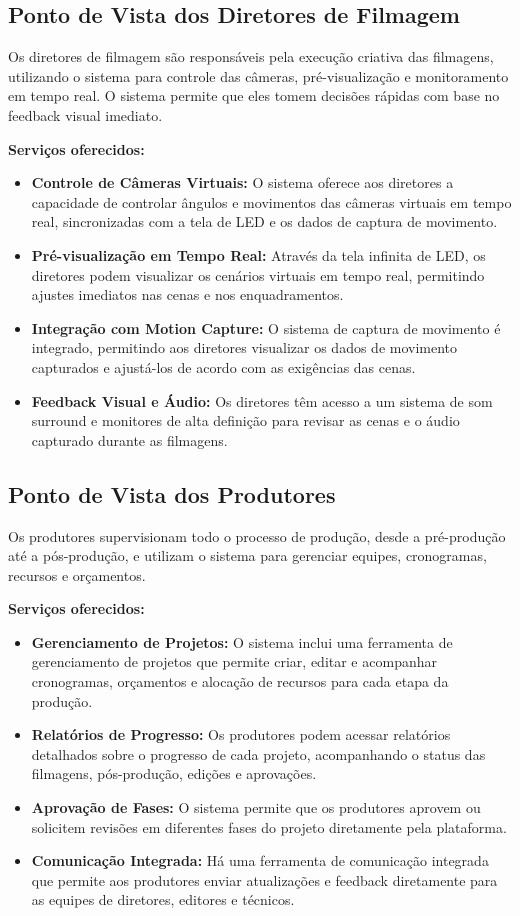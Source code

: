 \subsection{Ponto de Vista dos Diretores de Filmagem}

Os diretores de filmagem são responsáveis pela execução criativa das filmagens, utilizando o sistema para controle das câmeras, pré-visualização e monitoramento em tempo real. O sistema permite que eles tomem decisões rápidas com base no feedback visual imediato.

\textbf{Serviços oferecidos:}
\begin{itemize}
  \item \textbf{Controle de Câmeras Virtuais:} O sistema oferece aos diretores a capacidade de controlar ângulos e movimentos das câmeras virtuais em tempo real, sincronizadas com a tela de LED e os dados de captura de movimento.
  \item \textbf{Pré-visualização em Tempo Real:} Através da tela infinita de LED, os diretores podem visualizar os cenários virtuais em tempo real, permitindo ajustes imediatos nas cenas e nos enquadramentos.
  \item \textbf{Integração com Motion Capture:} O sistema de captura de movimento é integrado, permitindo aos diretores visualizar os dados de movimento capturados e ajustá-los de acordo com as exigências das cenas.
  \item \textbf{Feedback Visual e Áudio:} Os diretores têm acesso a um sistema de som surround e monitores de alta definição para revisar as cenas e o áudio capturado durante as filmagens.
\end{itemize}

\subsection{Ponto de Vista dos Produtores}

Os produtores supervisionam todo o processo de produção, desde a pré-produção até a pós-produção, e utilizam o sistema para gerenciar equipes, cronogramas, recursos e orçamentos.

\textbf{Serviços oferecidos:}
\begin{itemize}
  \item \textbf{Gerenciamento de Projetos:} O sistema inclui uma ferramenta de gerenciamento de projetos que permite criar, editar e acompanhar cronogramas, orçamentos e alocação de recursos para cada etapa da produção.
  \item \textbf{Relatórios de Progresso:} Os produtores podem acessar relatórios detalhados sobre o progresso de cada projeto, acompanhando o status das filmagens, pós-produção, edições e aprovações.
  \item \textbf{Aprovação de Fases:} O sistema permite que os produtores aprovem ou solicitem revisões em diferentes fases do projeto diretamente pela plataforma.
  \item \textbf{Comunicação Integrada:} Há uma ferramenta de comunicação integrada que permite aos produtores enviar atualizações e feedback diretamente para as equipes de diretores, editores e técnicos.
\end{itemize}

